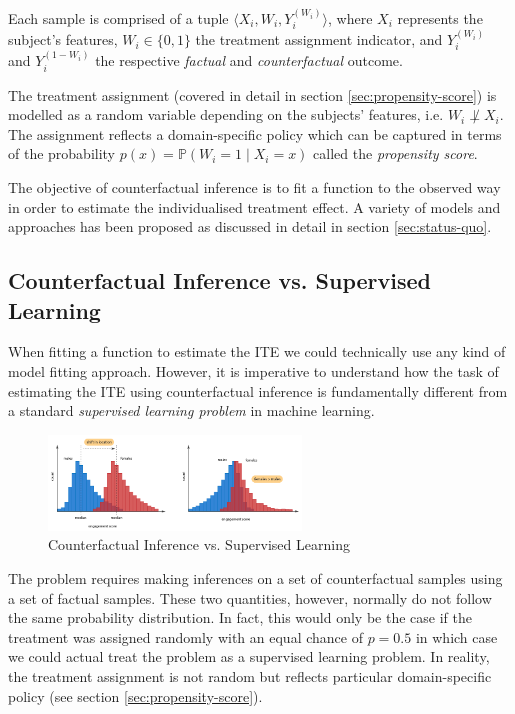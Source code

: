 Each sample is comprised of a tuple $ \langle X_i, W_i, Y_{i}^{(W_i)} \rangle$, where $X_i$ represents the subject's features, $W_i \in \{0,1\}$ the treatment assignment indicator, and $Y_{i}^{(W_i)}$ and $Y_{i}^{(1 - W_i)}$ the respective \emph{factual} and \emph{counterfactual} outcome. 

The treatment assignment (covered in detail in section \ref{sec:propensity-score}) is modelled as a random variable depending on the subjects' features, i.e. $W_i \not \perp X_i$. The assignment reflects a domain-specific policy which can be captured in terms of the probability $p(x) = \mathbb{P}(W_i = 1 \mid X_i = x)$ called the \emph{propensity score}.

The objective of counterfactual inference is to fit a function to the observed way in order to estimate the individualised treatment effect. A variety of models and approaches has been proposed as discussed in detail in section \ref{sec:status-quo}.


\subsection{Counterfactual Inference vs. Supervised Learning} \label{sec:cfi-vs-supervised-learning}
When fitting a function to estimate the ITE we could technically use any kind of model fitting approach. However, it is imperative to understand how the task of estimating the ITE using counterfactual inference is fundamentally different from a standard \emph{supervised learning problem} in machine learning.

\begin{figure}
	\centering
	\includegraphics[width=0.6\textwidth]{figures/chapter-2/counterfactual-vs-supervised-learning.png}
	\caption{Counterfactual Inference vs. Supervised Learning}\label{fig:counterfactual-inference-vs-supervised-learning}   
\end{figure}


The problem requires making inferences on a set of counterfactual samples using a set of factual
samples. These two quantities, however, normally do not follow the same probability distribution. In fact, this would only be the case if the treatment was assigned randomly with an equal chance of $p = 0.5$ in which case we could actual treat the problem as a supervised learning problem.  In reality, the treatment assignment is not random but reflects particular domain-specific policy (see section \ref{sec:propensity-score}). 

